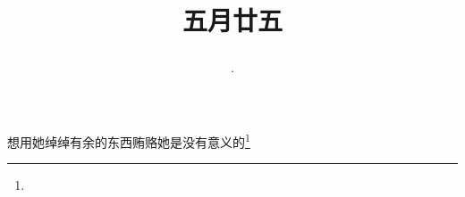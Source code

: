 \title{\date[d=30,m=6,y=2024][year:cn-y,年,month:cn,day:cn,日,·,weekday]·五月廿五 }
想用她绰绰有余的东西贿赂她是没有意义的\footnote{ }

